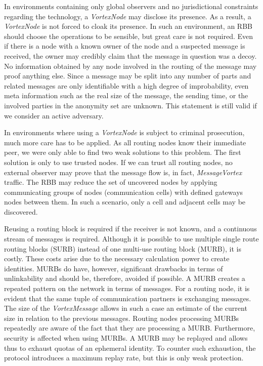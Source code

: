 \documentclass[acmsmall, screen]{acmart}
\begin{document}
In environments containing only global observers and no jurisdictional constraints regarding the technology, a \emph{VortexNode} may disclose its presence. As a result, a \emph{VortexNode} is not forced to cloak its presence. In such an environment, an RBB should choose the operations to be sensible, but great care is not required. Even if there is a node with a known owner of the node and a suspected message is received, the owner may credibly claim that the message in question was a decoy. No information obtained by any node involved in the routing of the message may proof anything else. Since a message may be split into any number of parts and related messages are only identifiable with a high degree of improbability, even meta information such as the real size of the message, the sending time, or the involved parties in the anonymity set are unknown. This statement is still valid if we consider an active adversary.

In environments where using a \emph{VortexNode} is subject to criminal prosecution, much more care has to be applied. As all routing nodes know their immediate peer, we were only able to find two weak solutions to this problem. The first solution is only to use trusted nodes. If we can trust all routing nodes, no external observer may prove that the message flow is, in fact, \emph{MessageVortex} traffic. The RBB may reduce the set of uncovered nodes by applying communicating groups of nodes (communication cells) with defined gateways nodes between them. In such a scenario, only a cell and adjacent cells may be discovered.

Reusing a routing block is required if the receiver is not known, and a continuous stream of messages is required. Although it is possible to use multiple single route routing blocks (SURB) instead of one multi-use routing block (MURB), it is costly. These costs arise due to the necessary calculation power to create identities. MURBs do have, however, significant drawbacks in terms of unlinkability and should be, therefore, avoided if possible. A MURB creates a repeated pattern on the network in terms of messages. For a routing node, it is evident that the same tuple of communication partners is exchanging messages. The size of the \emph{VortexMessage} allows in such a case an estimate of the current size in relation to the previous messages. Routing nodes processing MURBs repeatedly are aware of the fact that they are processing a MURB. Furthermore, security is affected when using MURBs. A MURB may be replayed and allows thus to exhaust quotas of an ephemeral identity. To counter such exhaustion, the protocol introduces a maximum replay rate, but this is only weak protection.
\end{document}

